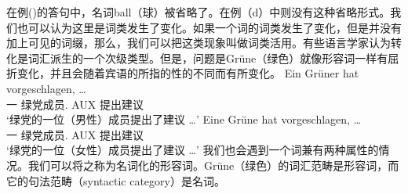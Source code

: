 \noindent
在例()的答句中，名词ball（球）被省略了。在例（d）中则没有这种省略形式。我们也可以认为这里是词类发生了变化。如果一个词的词类发生了变化，但是并没有加上可见的词缀，那么，我们可以把这类现象叫做词类活用。有些语言学家认为转化是词汇派生的一个次级类型。但是，问题是Grüne（绿色）就像形容词一样有屈折变化，并且会随着宾语的所指的性的不同而有所变化。
\eal
\ex 
\gll Ein Grüner hat vorgeschlagen, \ldots\\
	 一 绿党成员.\mas{} AUX 提出建议\\
\glt `绿党的一位（男性）成员提出了建议 \ldots'
\ex 
\gll Eine Grüne hat vorgeschlagen, \ldots\\
	 一 绿党成员.\fem{} AUX 提出建议\\
\glt `绿党的一位（女性）成员提出了建议 \ldots'
\zl
我们也会遇到一个词兼有两种属性的情况。我们可以将之称为名词化的形容词。Grüne（绿色）的词汇范畴是形容词，而它的句法范畴（syntactic category）是名词。


